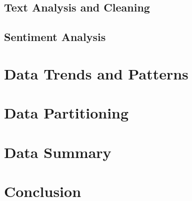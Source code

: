 \subsection{Text Analysis and Cleaning}
\label{chp3-sec2.1}



\subsection{Sentiment Analysis}
\label{chp3-sec2.2}



\section{Data Trends and Patterns}
\label{chp3-sec3}




\section{Data Partitioning}
\label{chp3-sec4}




\section{Data Summary}
\label{chp3-sec5}



\section{Conclusion}
\label{chp3-sec6}